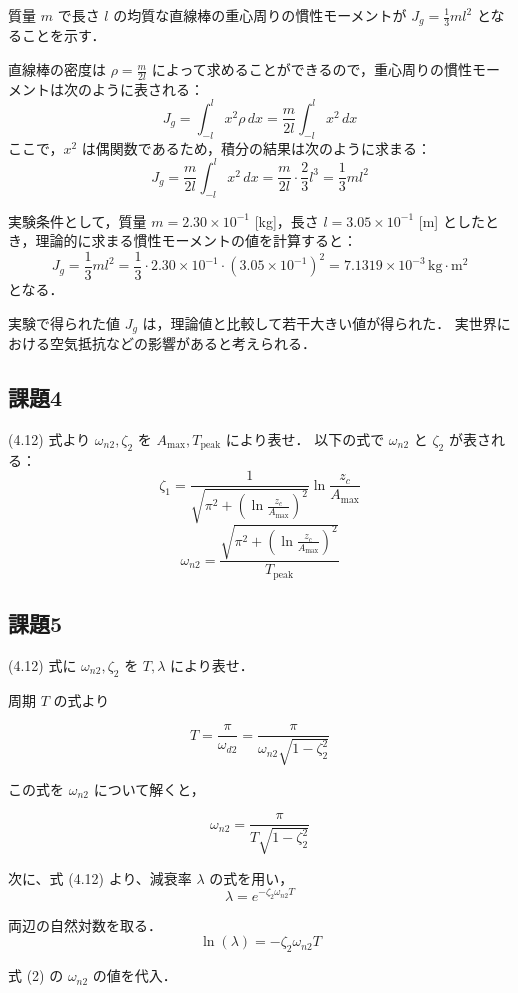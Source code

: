 質量 \(m\) で長さ \(l\) の均質な直線棒の重心周りの慣性モーメントが \(J_g = \frac{1}{3}ml^2\) となることを示す．

直線棒の密度は \(\rho = \frac{m}{2l}\) によって求めることができるので，重心周りの慣性モーメントは次のように表される：
\[
  J_g = \int_{-l}^{l} x^2 \rho \, dx = \frac{m}{2l} \int_{-l}^{l} x^2 \, dx
\]
ここで，\(x^2\) は偶関数であるため，積分の結果は次のように求まる：
\[
  J_g = \frac{m}{2l} \int_{-l}^{l} x^2 \, dx = \frac{m}{2l} \cdot \frac{2}{3} l^3 = \frac{1}{3} ml^2
\]

実験条件として，質量 \(m = 2.30 \times 10^{-1}\) [kg]，長さ \(l = 3.05 \times 10^{-1}\) [m] としたとき，理論的に求まる慣性モーメントの値を計算すると：
\[
  J_g = \frac{1}{3}ml^2 = \frac{1}{3} \cdot 2.30 \times 10^{-1} \cdot (3.05 \times 10^{-1})^2 = 7.1319 \times 10^{-3} \, \text{kg} \cdot \text{m}^2
\]
となる．

実験で得られた値 \(J_g\) は，理論値と比較して若干大きい値が得られた．
実世界における空気抵抗などの影響があると考えられる．

\subsection*{課題4}
(4.12) 式より $\omega_{n2}, \zeta_2$ を $A_{\max}, T_{\text{peak}}$ により表せ．
以下の式で $\omega_{n2}$ と $\zeta_2$ が表される：
\[
  \zeta_1 = \frac{1}{\sqrt{\pi^2 + \left( \ln \frac{z_c}{A_{\max}} \right)^2}} \ln \frac{z_c}{A_{\max}}
\]
\[
  \omega_{n2} = \frac{\sqrt{\pi^2 + \left( \ln \frac{z_c}{A_{\max}} \right)^2}}{T_{\text{peak}}}
\]

\subsection*{課題5}
(4.12) 式に $\omega_{n2}, \zeta_2$ を $T, \lambda$ により表せ．

周期 \(T\) の式より

\[
  T = \frac{\pi}{\omega_{d2}} = \frac{\pi}{\omega_{n2} \sqrt{1 - \zeta_2^2}} \tag{1}
\]

この式を \(\omega_{n2}\) について解くと，

\[
  \omega_{n2} = \frac{\pi}{T \sqrt{1 - \zeta_2^2}} \tag{2}
\]

次に、式 (4.12) より、減衰率 \(\lambda\) の式を用い，
\[
  \lambda = e^{-\zeta_2 \omega_{n2} T} \tag{3}
\]

両辺の自然対数を取る．
\[
  \ln(\lambda) = -\zeta_2 \omega_{n2} T \tag{4}
\]

式 (2) の \(\omega_{n2}\) の値を代入．

